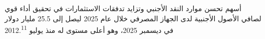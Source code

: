 أسهم تحسن موارد النقد الأجنبي وتزايد تدفقات الاستثمارات في تحقيق أداء قوي لصافي الأصول الأجنبية لدى الجهاز المصرفي خلال عام 2025 ليصل إلى 25.5 مليار دولار في ديسمبر 2025، وهو أعلى مستوى له منذ يوليو 2012.\textsuperscript{11}
